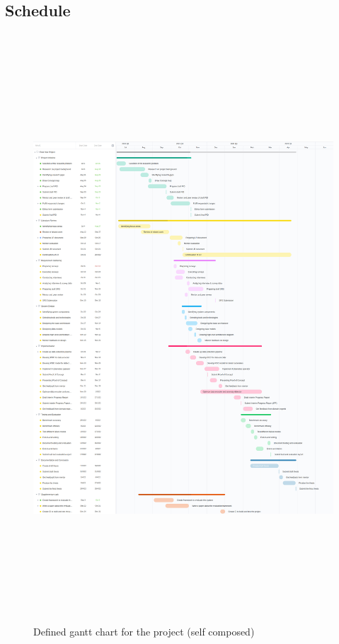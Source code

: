 \subsection{Schedule}
\begin{figure}[H]
    \includegraphics[height=22cm]{assets/methodology/gantt-chart.jpg}
    \caption{Defined gantt chart for the project (self composed)}
\end{figure}



